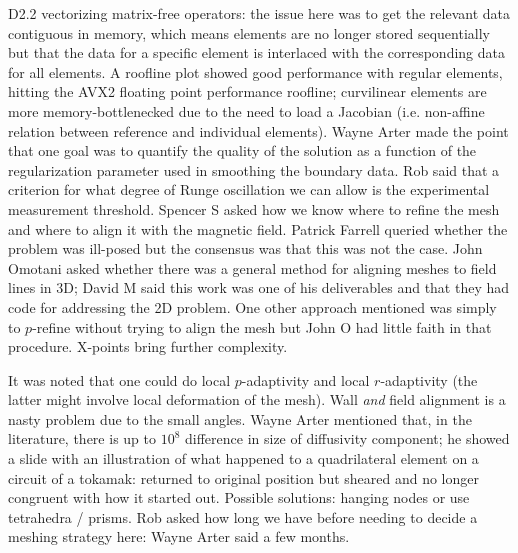 D2.2 vectorizing matrix-free operators: the issue here was to get the relevant 
data contiguous in memory, which means elements are no longer stored 
sequentially but that the data for a specific element is interlaced with the 
corresponding data for all elements.  A roofline plot showed good performance 
with regular elements, hitting the AVX2 floating point performance roofline; 
curvilinear elements are more memory-bottlenecked due to the need to load a 
Jacobian (i.e. non-affine relation between reference and individual elements).  
Wayne Arter made the point that one goal was to quantify the quality of the 
solution as a function of the regularization parameter used in smoothing the 
boundary data.  Rob said that a criterion for what degree of Runge oscillation 
we can allow is the experimental measurement threshold.
Spencer S asked how we know where to refine the mesh and where to align it with 
the magnetic field.  Patrick Farrell queried whether the problem was ill-posed 
but the consensus was that this was not the case.  John Omotani asked whether 
there was a general method for aligning meshes to field lines in 3D; David M 
said this work was one of his deliverables and that they had code for 
addressing the 2D problem.  One other approach mentioned was simply to 
$p$-refine without trying to align the mesh but John O had little faith in that 
procedure.  X-points bring further complexity.

It was noted that one could do local $p$-adaptivity and local $r$-adaptivity 
(the latter might involve local deformation of the mesh).  Wall {\it and} field 
alignment is a nasty problem due to the small angles.  Wayne Arter mentioned 
that, in the literature, there is up to $10^8$ difference in size of 
diffusivity component; he showed a slide with an illustration of what happened 
to a quadrilateral element on a circuit of a tokamak: returned to original 
position but sheared and no longer congruent with how it started out.  Possible 
solutions: hanging nodes or use tetrahedra / prisms.  Rob asked how long we 
have before needing to decide a meshing strategy here: Wayne Arter said a few 
months.

